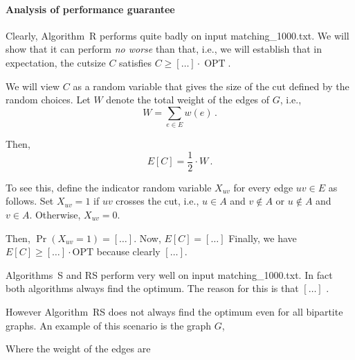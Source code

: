 \documentclass{tufte-handout}
\begin{document}
\paragraph{Analysis of performance guarantee}

Clearly, Algorithm~R performs quite badly on input 
  matching\_1000.txt.
We will show that it can perform \emph{no worse} than that, i.e., we
will establish that in expectation, the cutsize $C$ satisfies $C \geq
[\ldots]\cdot \operatorname{OPT}$.


We will view $C$ as a random variable that gives the size of the cut
defined by the random choices.
Let $W$ denote the total weight of the edges of $G$, i.e.,
\[ W= \sum_{e\in E} w(e)\,.\]

Then,
\begin{equation}\label{eq: E[C]}
E[C] = \textstyle\frac{1}{2}\cdot W\,.
\end{equation}

To see this, define the indicator random variable $X_{uv}$ for every
edge $uv\in E$ as follows.
Set $X_{uv}=1$ if $uv$ crosses the cut, i.e., $u\in A$ and $v\notin A$
or $u\notin A$ and $v\in A$.
Otherwise, $X_{uv} = 0$.

Then, $\Pr(X_{uv} = 1) = [\ldots]$.
Now, $E[C]=[\ldots]$ Finally, we have 
\(E[C]\geq [\ldots]\cdot \text{OPT}\) because clearly
$[\ldots]$.

\bigskip
Algorithms~S and RS perform very well on input matching\_1000.txt. In fact
both algorithms always find the optimum. The reason for this is that $[\ldots]$
.

However Algorithm~RS does not always find the optimum even for all bipartite graphs. 
An example of this scenario is the graph $G$,

\bigskip

Where the weight of the edges are
\end{document}
